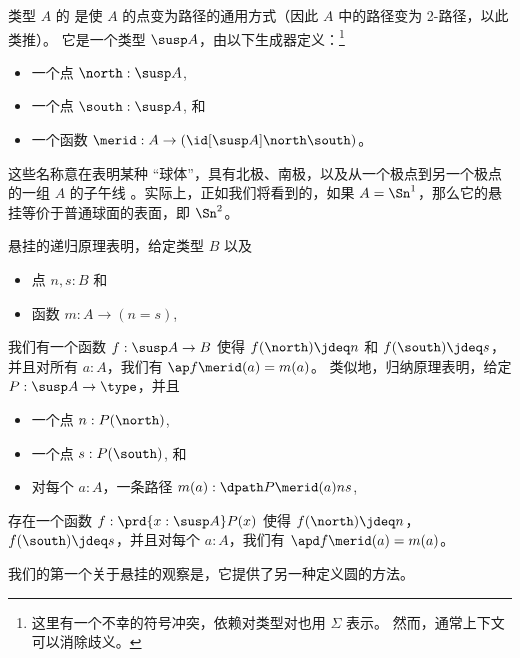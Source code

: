 %
%
类型 $A$ 的  是使 $A$ 的点变为路径的通用方式（因此 $A$ 中的路径变为 2-路径，以此类推）。
它是一个类型 $\susp A$，由以下生成器定义：\footnote{这里有一个不幸的符号冲突，依赖对类型对也用 $\Sigma$ 表示。
然而，通常上下文可以消除歧义。}
\begin{itemize}
  \item 一个点 $\north:\susp A$,
  \item 一个点 $\south:\susp A$, 和
  \item 一个函数 $\merid:A \to (\id[\susp A]\north\south)$。
\end{itemize}
这些名称意在表明某种 ``球体''，具有北极、南极，以及从一个极点到另一个极点的一组 $A$ 的子午线
%
%
。实际上，正如我们将看到的，如果 $A=\Sn^1$，那么它的悬挂等价于普通球面的表面，即 $\Sn^2$。

%
悬挂的递归原理表明，给定类型 $B$ 以及
\begin{itemize}
  \item 点 $n,s:B$ 和
  \item 函数 $m:A \to (n=s)$,
\end{itemize}
我们有一个函数 $f:\susp A \to B$ 使得 $f(\north)\jdeq n$ 和 $f(\south)\jdeq s$，并且对所有 $a:A$，我们有 $\ap f {\merid(a)} = m(a)$。
%
类似地，归纳原理表明，给定 $P:\susp A \to \type$，并且
\begin{itemize}
  \item 一个点 $n:P(\north)$,
  \item 一个点 $s:P(\south)$, 和
  \item 对每个 $a:A$，一条路径 $m(a):\dpath P{\merid(a)}ns$,
\end{itemize}
存在一个函数 $f:\prd{x:\susp A} P(x)$ 使得 $f(\north)\jdeq n$，$f(\south)\jdeq s$，并且对每个 $a:A$，我们有 $\apd f {\merid(a)} = m(a)$。

我们的第一个关于悬挂的观察是，它提供了另一种定义圆的方法。

